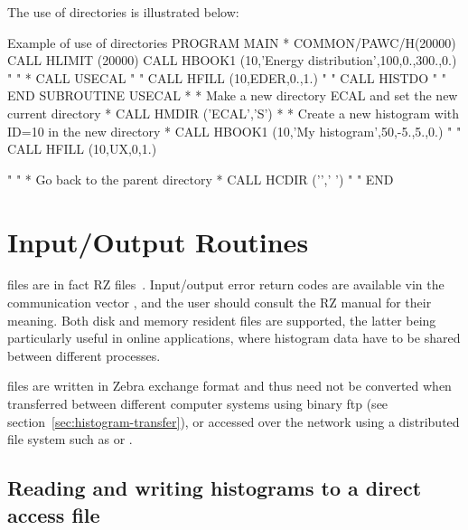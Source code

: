The use of directories is illustrated below:
 
\begin{XMPt}{Example of use of directories}
      PROGRAM MAIN
*
      COMMON/PAWC/H(20000)
      CALL HLIMIT (20000)
      CALL HBOOK1 (10,'Energy distribution',100,0.,300.,0.)
           "   "
*
      CALL USECAL
           "   "
      CALL HFILL (10,EDER,0.,1.)
           "   "
      CALL HISTDO
           "   "
      END
      SUBROUTINE USECAL
*
*        Make a new directory ECAL and set the new current directory
*
          CALL HMDIR ('ECAL','S')
*
*        Create a new histogram with ID=10 in the new directory
*
          CALL HBOOK1 (10,'My histogram',50,-5.,5.,0.)
           "   "
          CALL HFILL (10,UX,0,1.)
 
           "   "
*         Go back to the parent directory
*
          CALL HCDIR ('\bs','  ')
           "   "
      END
\end{XMPt}

\newpage%

\section{Input/Output Routines}
\label{HINOUTPU}
 
\HBOOK{} files are in fact \ZEBRA{} RZ files~\cite{bib-ZEBRA}.
%
%
Input/output error return codes are available
vin the \ZEBRA{} communication vector ,
and the user should consult the RZ manual for their meaning.
Both disk and memory resident files are supported, the latter being
particularly useful in online applications,
where histogram data have to be shared between different processes.
 

\HBOOK{} files are written in Zebra exchange format and thus
need not be converted when transferred between different computer
systems using binary ftp (see section~\ref{sec:histogram-transfer}),
or accessed over the network using
a distributed file system such as  or .
 
\subsection*{Reading and writing histograms to a direct access file}
 
